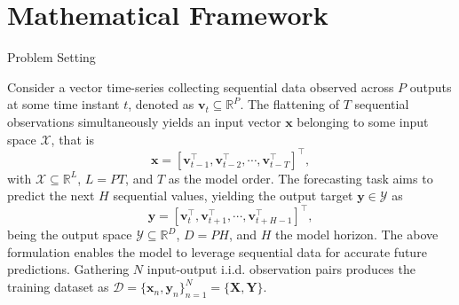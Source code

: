\section{Mathematical Framework}

\begin{frame}{Problem Setting}

Consider a vector time-series collecting sequential data observed across $P$ outputs at some time instant \( t \), denoted as \( \boldsymbol{v}_t \subseteq \mathbb{R}^{P}\). The flattening of \( T \) sequential observations simultaneously yields an input vector \( \boldsymbol{x} \) belonging to some input space \( \mathcal{X} \), that is
\[
\boldsymbol{x}= [ \boldsymbol{v}_{t-1}^\top, \boldsymbol{v}_{t-2}^\top, \cdots, \boldsymbol{v}_{t-T}^\top  ]^\top,
\]
with \( {\mathcal{X}} \subseteq \mathbb{R}^{L} \), \( L = PT \), and \( T \) as the model order. The forecasting task aims to predict the next \(H\) sequential values, yielding the output target \( \boldsymbol{y} \in {\mathcal{Y}} \) as
\[
\boldsymbol{y} = [ \boldsymbol{v}_{t}^\top, \boldsymbol{v}_{t+1}^\top, \cdots, \boldsymbol{v}_{t+H-1}^\top  ]^\top,
\] 
being the output space \( {\mathcal{Y}} \subseteq \mathbb{R}^{D} \), \( D = PH \), and \( H \) the model horizon. The above formulation enables the model to leverage sequential data for accurate future predictions. Gathering \( N \) input-output i.i.d. observation pairs produces the training dataset as \( {\mathcal{D}} = \{\boldsymbol{x}_n, \boldsymbol{y}_n\}_{n=1}^N = \{ \boldsymbol{X}, \boldsymbol{Y}\} \).

\end{frame}